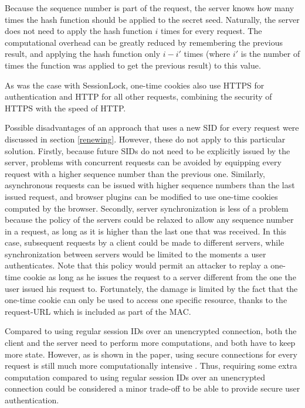 Because the sequence number is part of the request, the server knows how many times the hash function should be applied to the secret seed. Naturally, the server does not need to apply the hash function $i$ times for every request. The computational overhead can be greatly reduced by remembering the previous result, and applying the hash function only $i - i'$ times (where $i'$ is the number of times the function was applied to get the previous result) to this value.

As was the case with SessionLock, one-time cookies also use HTTPS for authentication and HTTP for all other requests, combining the security of HTTPS with the speed of HTTP.

Possible disadvantages of an approach that uses a new SID for every request were discussed in section \ref{renewing}. However, these do not apply to this particular solution. Firstly, because future SIDs do not need to be explicitly issued by the server, problems with concurrent requests can be avoided by equipping every request with a higher sequence number than the previous one. Similarly, asynchronous requests can be issued with higher sequence numbers than the last issued request, and browser plugins can be modified to use one-time cookies computed by the browser. Secondly, server synchronization is less of a problem because the policy of the servers could be relaxed to allow any sequence number in a request, as long as it is higher than the last one that was received. In this case, subsequent requests by a client could be made to different servers, while synchronization between servers would be limited to the moments a user authenticates. Note that this policy would permit an attacker to replay a one-time cookie as long as he issues the request to a server different from the one the user issued his request to. Fortunately, the damage is limited by the fact that the one-time cookie can only be used to access one specific resource, thanks to the request-URL which is included as part of the MAC.

Compared to using regular session IDs over an unencrypted connection, both the client and the server need to perform more computations, and both have to keep more state. However, as is shown in the paper, using secure connections for every request is still much more computationally intensive \cite{Dacosta2011}. Thus, requiring some extra computation compared to using regular session IDs over an unencrypted connection could be considered a minor trade-off to be able to provide secure user authentication.

